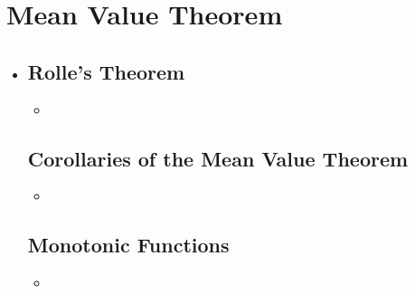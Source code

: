 \section{Mean Value Theorem}
\begin{itemize}
  \item []
  
  \subsection{Rolle's Theorem}
  \begin{itemize}
    \item 
  \end{itemize}
  
  \subsection{Corollaries of the Mean Value Theorem}
  \begin{itemize}
    \item 
  \end{itemize}

  \subsection{Monotonic Functions}
  \begin{itemize}
  \item []
  \end{itemize}  

\end{itemize}

